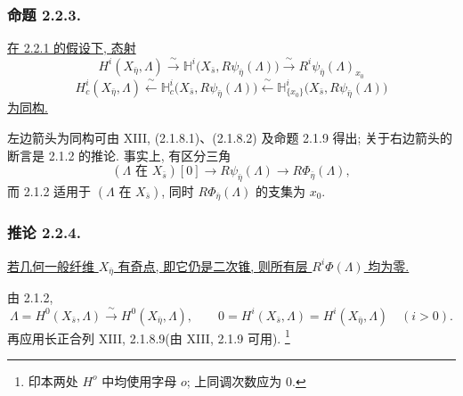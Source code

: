 \subsubsection*{命题 2.2.3.}
\underline{在 2.2.1 的假设下, 态射}
\[
H^i(X_{\bar\eta},\Lambda)
 \xrightarrow{\ \sim\ }
\mathbb H^i\bigl(X_{\bar s},R\psi_{\bar\eta}(\Lambda)\bigr)
 \xrightarrow{\ \sim\ }
R^i\psi_{\bar\eta}(\Lambda)_{x_0}
\]
\[
H_c^i(X_{\bar\eta},\Lambda)
 \xleftarrow{\ \sim\ }
\mathbb H_c^i\bigl(X_{\bar s},R\psi_{\bar\eta}(\Lambda)\bigr)
 \xleftarrow{\ \sim\ }
\mathbb H^i_{\{x_0\}}\bigl(X_{\bar s},R\psi_{\bar\eta}(\Lambda)\bigr)
\]
\underline{为同构.}

左边箭头为同构可由 XIII, (2.1.8.1)、(2.1.8.2) 及命题 2.1.9 得出; 关于右边箭头的断言是 2.1.2 的推论. 事实上, 有区分三角
\[
(\Lambda\text{ 在 }X_{\bar s})[0]
 \longrightarrow R\psi_{\bar\eta}(\Lambda)
 \longrightarrow R\Phi_{\bar\eta}(\Lambda),
\]
而 2.1.2 适用于 $(\Lambda\text{ 在 }X_{\bar s})$, 同时 $R\Phi_{\bar\eta}(\Lambda)$ 的支集为 $x_0$.

\subsubsection*{推论 2.2.4.}
\underline{若几何一般纤维 $X_{\bar\eta}$ 有奇点, 即它仍是二次锥, 则所有层 $R^i\Phi(\Lambda)$ 均为零.}

由 2.1.2,
\[
\Lambda=H^0(X_{\bar s},\Lambda)
 \xrightarrow{\ \sim\ }H^0(X_{\bar\eta},\Lambda),
\qquad
0=H^i(X_{\bar s},\Lambda)=H^i(X_{\bar\eta},\Lambda)
\quad(i>0).
\]
再应用长正合列 XIII, 2.1.8.9(由 XIII, 2.1.9 可用).
\footnote{印本两处 $H^o$ 中均使用字母 $o$; 上同调次数应为 $0$.}
